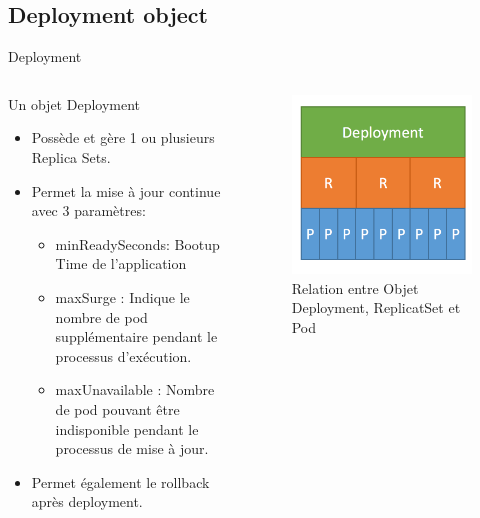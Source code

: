 \documentclass{bredelebeamer}
\begin{document}
\subsection{Deployment object}
\begin{frame}{Deployment}
\begin{columns}
\begin{column}{0.5\textwidth}
Un objet Deployment
\begin{itemize}
	\item Possède et gère 1 ou plusieurs Replica Sets.
	\item Permet la mise à jour continue avec 3 paramètres: 
	\begin{itemize}
	\item minReadySeconds: Bootup Time de l'application\\
	\vspace{2px}
	\item maxSurge : Indique le nombre de pod supplémentaire pendant le processus d'exécution.
	\item maxUnavailable : Nombre de pod pouvant être indisponible pendant le processus de mise à jour.
	\end{itemize}
	\item Permet également le rollback après deployment.
\end{itemize}


\end{column}
\begin{column}{0.5\textwidth}
\begin{figure}
\centering
\includegraphics[scale=0.4]{images/img18.png}
\caption{Relation entre Objet Deployment, ReplicatSet et Pod}
\end{figure}

\end{column}
\end{columns}
\end{frame}
\end{document}

